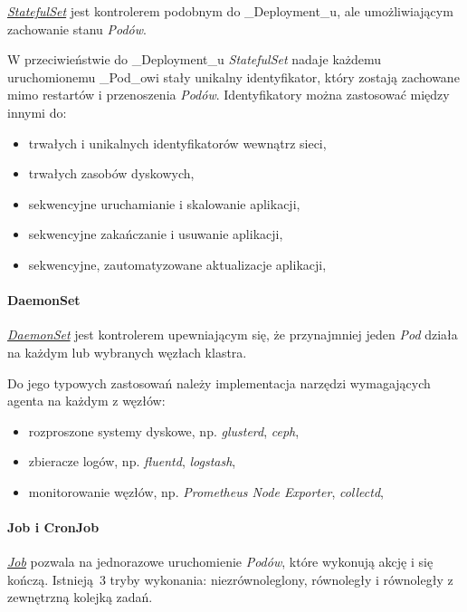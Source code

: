 \documentclass[a4paper,12pt,twoside,openany]{report}
\providecommand{\tightlist}{%
  \setlength{\itemsep}{0pt}\setlength{\parskip}{0pt}}
\begin{document}
\href{https://kubernetes.io/docs/concepts/workloads/controllers/statefulset/}{\emph{StatefulSet}}
jest kontrolerem podobnym do \_Deployment\_u, ale umożliwiającym
zachowanie stanu \emph{Podów}.

W przeciwieństwie do \_Deployment\_u \emph{StatefulSet} nadaje każdemu
uruchomionemu \_Pod\_owi stały unikalny identyfikator, który zostają
zachowane mimo restartów i przenoszenia \emph{Podów}. Identyfikatory
można zastosować między innymi do:

\begin{itemize}
\tightlist
\item
  trwałych i unikalnych identyfikatorów wewnątrz sieci,
\item
  trwałych zasobów dyskowych,
\item
  sekwencyjne uruchamianie i skalowanie aplikacji,
\item
  sekwencyjne zakańczanie i usuwanie aplikacji,
\item
  sekwencyjne, zautomatyzowane aktualizacje aplikacji,
\end{itemize}

\hypertarget{daemonset}{%
\paragraph{DaemonSet}\label{daemonset}}

\href{https://kubernetes.io/docs/concepts/workloads/controllers/daemonset/}{\emph{DaemonSet}}
jest kontrolerem upewniającym się, że przynajmniej jeden \emph{Pod}
działa na każdym lub wybranych węzłach klastra.

Do jego typowych zastosowań należy implementacja narzędzi wymagających
agenta na każdym z węzłów:

\begin{itemize}
\tightlist
\item
  rozproszone systemy dyskowe, np. \emph{glusterd}, \emph{ceph},
\item
  zbieracze logów, np. \emph{fluentd}, \emph{logstash},
\item
  monitorowanie węzłów, np. \emph{Prometheus Node Exporter},
  \emph{collectd},
\end{itemize}

\hypertarget{job-i-cronjob}{%
\paragraph{Job i CronJob}\label{job-i-cronjob}}

\href{https://kubernetes.io/docs/concepts/workloads/controllers/jobs-run-to-completion/}{\emph{Job}}
pozwala na jednorazowe uruchomienie \emph{Podów}, które wykonują akcję i
się kończą. Istnieją~3 tryby wykonania: niezrównoleglony, równoległy i
równoległy z zewnętrzną kolejką zadań.
\end{document}
